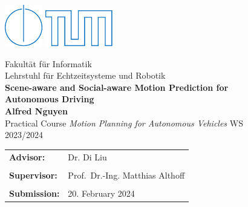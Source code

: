\begin{figure}[!h]

  \includegraphics{images/IN.pdf} \hfil \includegraphics{images/tumlogo.pdf}
 
  \vspace*{1cm}
  {\large \textsf{Fakult{\"a}t f{\"u}r Informatik}}\\
  {\large \textsf{Lehrstuhl f{\"u}r Echtzeitsysteme und Robotik}}\\
   

  \vspace*{5cm}
%
%
%
%
  {\color{tumblue} \Huge \bf \textsf{Scene-aware and Social-aware Motion Prediction for Autonomous Driving}}\\  %

  \vspace*{1cm}
%
%
%
% 
  {\Large \bf \textsf{Alfred Nguyen}}\\   %
 
  \vspace*{8cm}
  {\Large \textsf{Practical Course \emph{Motion Planning for Autonomous Vehicles} WS 2023/2024}}\\
 
  \vspace*{1cm} 
  \begin{tabular}{ll}
%
%
%
%
    {\Large \bf \textsf{Advisor:}} &
    {\Large \textsf{Dr. Di Liu}}\\                  %
    \\

    {\Large \bf \textsf{Supervisor:}} &
    {\Large \textsf{Prof.~Dr.-Ing. Matthias Althoff}}\\
    \\

%
%
%
%
    {\Large \bf \textsf{Submission:}} &
    {\Large \textsf{20. February 2024}}

  \end{tabular}
  
\end{figure}
